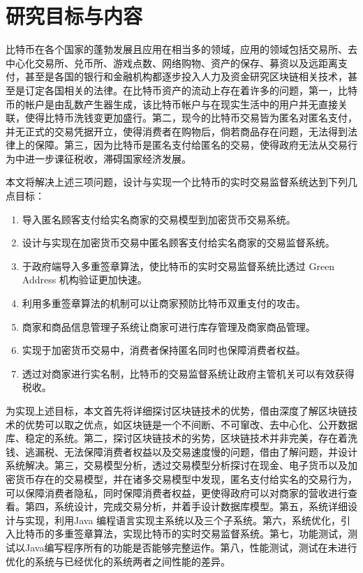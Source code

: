 		

	\section{研究目标与内容}
	比特币在各个国家的蓬勃发展且应用在相当多的领域，应用的领域包括交易所、去中心化交易所、兑币所、游戏点数、网络购物、资产的保存、募资以及远距离支付，甚至是各国的银行和金融机构都逐步投入人力及资金研究区块链相关技术，甚至是订定各国相关的法律。在比特币资产的流动上存在着许多的问题，第一，比特币的帐户是由乱数产生器生成，该比特币帐户与在现实生活中的用户并无直接关联，使得比特币洗钱变更加盛行。第二，现今的比特币交易皆为匿名对匿名支付，并无正式的交易凭据开立，使得消费者在购物后，倘若商品存在问题，无法得到法律上的保障。第三，因为比特币是匿名支付给匿名的交易，使得政府无法从交易行为中进一步课征税收，滞碍国家经济发展。

	本文将解决上述三项问题，设计与实现一个比特币的实时交易监督系统达到下列几点目标：

		\begin{enumerate}
			\item 导入匿名顾客支付给实名商家的交易模型到加密货币交易系统。
			\item 设计与实现在加密货币交易中匿名顾客支付给实名商家的交易监督系统。
			\item 于政府端导入多重签章算法，使比特币的实时交易监督系统比透过 Green Address 机构验证更加快速。
			\item 利用多重签章算法的机制可以让商家预防比特币双重支付的攻击。
			\item 商家和商品信息管理⼦系统让商家可进行库存管理及商家商品管理。
			\item 实现于加密货币交易中，消费者保持匿名同时也保障消费者权益。
			\item 透过对商家进行实名制，比特币的交易监督系统让政府主管机关可以有效获得税收。
		\end{enumerate}

	为实现上述目标，本文首先将详细探讨区块链技术的优势，借由深度了解区块链技术的优势可以取之优点，如区块链是一个不间断、不可窜改、去中心化、公开数据库、稳定的系统。第二，探讨区块链技术的劣势，区块链技术并非完美，存在着洗钱、逃漏税、无法保障消费者权益以及交易速度慢的问题，借由了解问题，并设计系统解决。第三，交易模型分析，透过交易模型分析探讨在现金、电子货币以及加密货币存在的交易模型，并在诸多交易模型中发现，匿名支付给实名的交易行为，可以保障消费者隐私，同时保障消费者权益，更使得政府可以对商家的营收进行查看。第四，系统设计，完成交易分析，并着⼿设计数据库模型。第五，系统详细设计与实现，利⽤Java 编程语⾔实现主系统以及三个⼦系统。第六，系统优化，引入比特币的多重签章算法，实现比特币的实时交易监督系统。第七，功能测试，测试以Java编写程序所有的功能是否能够完整运作。第八，性能测试，测试在未进行优化的系统与已经优化的系统两者之间性能的差异。


